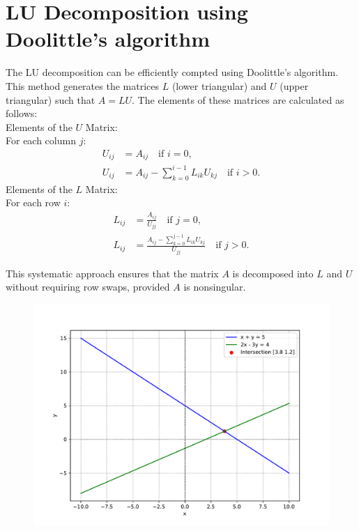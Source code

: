 \documentclass[journal]{IEEEtran}
\begin{document}
\section*{LU Decomposition using Doolittle's algorithm}
The LU decomposition can be efficiently compted using Doolittle's algorithm. This method generates the matrices \( L \) (lower triangular) and \( U \) (upper triangular) such that \( A = LU \). The elements of these matrices are calculated as follows: \\
Elements of the \( U \) Matrix:  \\
For each column \( j \):
\begin{align}
	U_{ij} &= A_{ij} \quad \text{if } i = 0, \\
	U_{ij} &= A_{ij} - \sum_{k=0}^{i-1} L_{ik} U_{kj} \quad \text{if } i > 0.
\end{align}
Elements of the \( L \) Matrix: \\
For each row \( i \):
\begin{align}
	L_{ij} &= \frac{A_{ij}}{U_{jj}} \quad \text{if } j = 0, \\
	L_{ij} &= \frac{A_{ij} - \sum_{k=0}^{j-1} L_{ik} U_{kj}}{U_{jj}} \quad \text{if } j > 0.
\end{align}

This systematic approach ensures that the matrix \( A \) is decomposed into \( L \) and \( U \) without requiring row swaps, provided \( A \) is nonsingular.
\begin{figure}[h!]
   \centering
   \includegraphics[width=\columnwidth]{figs/fig.pdf}
\end{figure}
\end{document}
